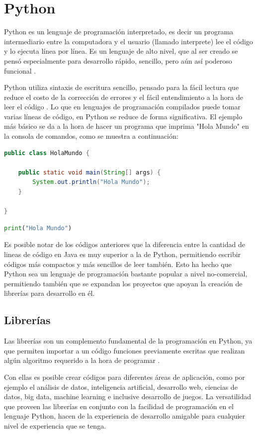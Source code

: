 \section{Python}
Python es un lenguaje de programación interpretado, es decir un programa intermediario entre la computadora y el usuario (llamado interprete) lee el código y lo ejecuta línea por línea. Es un lenguaje de alto nivel, que al ser creado se pensó especialmente para desarrollo rápido, sencillo, pero aún así poderoso funcional \cite{van1995python}.
\par
Python utiliza sintaxis de escritura sencillo, pensado para la fácil lectura que reduce el costo de la corrección de errores y el fácil entendimiento a la hora de leer el código \cite{van1995python}. Lo que en lenguajes de programación compilados puede tomar varias líneas de código, en Python se reduce de forma significativa. El ejemplo más básico se da a la hora de hacer un programa que imprima "Hola Mundo" en la consola de comandos, como se muestra a continuación:

\begin{lstlisting}[language=Java,frame=single,caption=Código del Hola Mundo en Java, inputencoding=latin1]
public class HolaMundo {

	public static void main(String[] args) {		
		System.out.println("Hola Mundo");
	}

}
\end{lstlisting}
\begin{lstlisting}[language=Python,frame=single,caption=Código del Hola Mundo en Python, inputencoding=latin1]
print("Hola Mundo")
\end{lstlisting}

\par
Es posible notar de los códigos anteriores que la diferencia entre la cantidad de lineas de código en Java es muy superior a la de Python, permitiendo escribir códigos más compactos y más sencillos de leer también. Esto ha hecho que Python sea un lenguaje de programación bastante popular a nivel no-comercial, permitiendo también que se expandan los proyectos que apoyan la creación de librerías para desarrollo en él.


\subsection{Librerías}
\par
Las librerías son un complemento fundamental de la programación en Python, ya que permiten importar a un código funciones previamente escritas que realizan algún algoritmo requerido a la hora de programar \cite{van1995python}.
\par
Con ellas es posible crear códigos para diferentes áreas de aplicación, como por ejemplo el análisis de datos, inteligencia artificial, desarrollo web, ciencias de datos, big data, machine learning e inclusive desarrollo de juegos. La versatilidad que proveen las librerías en conjunto con la facilidad de programación en el lenguaje Python, hacen de la experiencia de desarrollo amigable para cualquier nivel de experiencia que se tenga.

